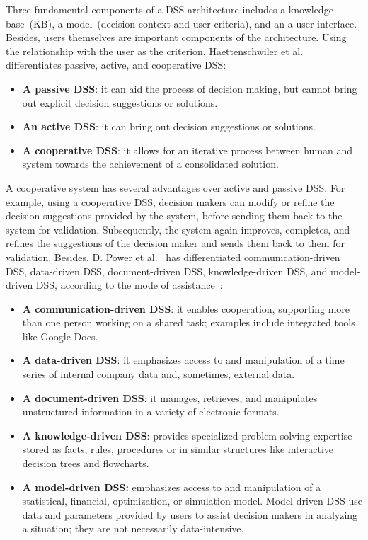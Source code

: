 \hspace*{3.5mm} Three fundamental components of a DSS architecture includes a knowledge base~(KB), a model~(decision context and user criteria), and an a user interface. Besides, users themselves are important components of the architecture. Using the relationship with the user as the criterion,  Haettenschwiler et al.~\cite{haettenschwiler1999neues} differentiates passive, active, and cooperative DSS:  

\begin{itemize}[noitemsep]
    \item \textbf{A passive DSS}: it can aid the process of decision making, but cannot bring out explicit decision suggestions or solutions.
    \item \textbf{An active DSS}: it can bring out decision suggestions or solutions. 
    \item \textbf{A cooperative DSS}: it allows for an iterative process between human and system towards the achievement of a consolidated solution.
\end{itemize}

\hspace*{3.5mm} A cooperative system has several advantages over active and passive DSS. For example, using a cooperative DSS, decision makers can modify or refine the decision suggestions provided by the system, before sending them back to the system for validation. Subsequently, the system again improves, completes, and refines the suggestions of the decision maker and sends them back to them for validation. Besides, D. Power et al.~\cite{power2002decision} has differentiated communication-driven DSS, data-driven DSS, document-driven DSS, knowledge-driven DSS, and model-driven DSS, according to the mode of assistance~\cite{power2002decision}:

\begin{itemize}[noitemsep]
    \item \textbf{A communication-driven DSS}: it enables cooperation, supporting more than one person working on a shared task; examples include integrated tools like Google Docs. 
    \item \textbf{A data-driven DSS}: it emphasizes access to and manipulation of a time series of internal company data and, sometimes, external data.
    \item \textbf{A document-driven DSS}: it manages, retrieves, and manipulates unstructured information in a variety of electronic formats.
    \item \textbf{A knowledge-driven DSS}: provides specialized problem-solving expertise stored as facts, rules, procedures or in similar structures like interactive decision trees and flowcharts.
    \item \textbf{A model-driven DSS:} emphasizes access to and manipulation of a statistical, financial, optimization, or simulation model. Model-driven DSS use data and parameters provided by users to assist decision makers in analyzing a situation; they are not necessarily data-intensive. 
\end{itemize}

